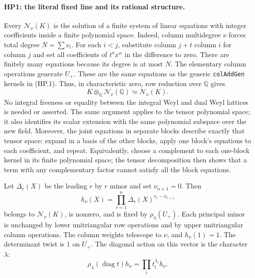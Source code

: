 \paragraph{HP1: the literal fixed line and its rational structure.}
\label{claim:HP1}
Every $\mathcal N_\nu(K)$ is the solution of a finite system of linear
equations with integer coefficients inside a finite polynomial space.
Indeed, column multidegree $\nu$ forces total degree $N=\sum\nu_i$.
For each $i<j$, substitute column $j+t$ column $i$ for column $j$ and
set all coefficients of $t^a x^\alpha$ in the difference to zero.
There are finitely many equations because its degree is at most $N$.
The elementary column operations generate $U_+$.  These are the same
equations as the generic \texttt{colAddGen} kernels in (HP.1).
Thus, in characteristic zero, row reduction over $\mathbb Q$ gives
\[
 K\otimes_{\mathbb Q}\mathcal N_\nu(\mathbb Q)
       \simeq\mathcal N_\nu(K).
 \tag{HP.3}
\]
No integral freeness or equality between the integral Weyl and dual
Weyl lattices is needed or asserted.  The same argument applies to
the tensor polynomial space; it also identifies its scalar extension
with the same polynomial subspace over the new field.  Moreover, the
joint equations in separate blocks describe exactly that tensor space:
expand in a basis of the other blocks, apply one block's equations to
each coefficient, and repeat.  Equivalently, choose a complement to
each one-block kernel in its finite polynomial space; the tensor
decomposition then shows that a term with any complementary factor
cannot satisfy all the block equations.

Let $\Delta_r(X)$ be the leading $r$ by $r$ minor and set
$\nu_{n+1}=0$.  Then
\[
             h_\nu(X)=\prod_{r=1}^n
                   \Delta_r(X)^{\nu_r-\nu_{r+1}}
 \tag{HP.4}
\]
belongs to $\mathcal N_\nu(K)$, is nonzero, and is fixed by
$\rho_\lambda(U_+)$.  Each principal minor is unchanged by lower
unitriangular row operations and by upper unitriangular column
operations.  The column weights telescope to $\nu$, and
$h_\nu(1)=1$.  The determinant twist is $1$ on $U_+$.
The diagonal action on this vector is the character $\lambda$:
\[
 \rho_\lambda(\operatorname{diag}t)h_\nu
                      =\prod_i t_i^{\lambda_i}h_\nu.
 \tag{HP.5}
\]

